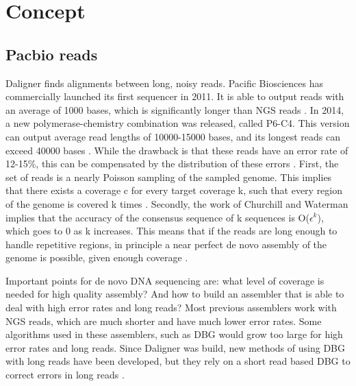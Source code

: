 \documentclass[../main/thesis.tex]{subfiles}
\begin{document}
\chapter{Concept}
\ifdefined\main
\newcommand{\codePath}{../3_concept/code/}
\newcommand{\figPath}{../3_concept/figures/}
\else

\fi

\section{Pacbio reads}
Daligner finds alignments between long, noisy reads.
Pacific Biosciences has commercially launched its first sequencer in 2011.
It is able to output reads with an average of 1000 bases, which is significantly longer than \ac{NGS} reads \cite{PBlaunch1}.
In 2014, a new polymerase-chemistry combination was released, called P6-C4.
This version can output average read lengths of 10000-15000 bases, and its longest reads can exceed 40000 bases \cite{Longreads}.
While the drawback is that these reads have an error rate of 12-15\%, this can be compensated by the distribution of these errors \cite{Daligner}.
First, the set of reads is a nearly Poisson sampling of the sampled genome.
This implies that there exists a coverage c for every target coverage k, such that every region of the genome is covered k times \cite{Poisson}.
Secondly, the work of Churchill and Waterman \cite{quality} implies that the accuracy of the consensus sequence of k sequences is O($\epsilon^k$), which goes to 0 as k increases.
This means that if the reads are long enough to handle repetitive regions, in principle a near perfect de novo assembly of the genome is possible, given enough coverage \cite{Daligner}.

Important points for de novo DNA sequencing are: what level of coverage is needed for high quality assembly?
And how to build an assembler that is able to deal with high error rates and long reads?
Most previous assemblers work with \ac{NGS} reads, which are much shorter and have much lower error rates.
Some algorithms used in these assemblers, such as \ac{DBG} \cite{DeBruijn} would grow too large for high error rates and long reads.
Since Daligner was build, new methods of using \ac{DBG} with long reads have been developed, but they rely on a short read based \ac{DBG} to correct errors in long reads \cite{DBG1}\cite{DBG2}.
\end{document}
